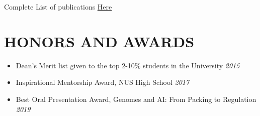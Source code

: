 \documentclass[letterpaper,11pt]{article}
\begin{document}
\hfill Complete List of publications {\href{https://tinyurl.com/pulications-sv}{\underline {Here}}}
\vspace{1mm}
\section{\bf HONORS AND AWARDS}
\begin{itemize}
    \item Dean’s Merit list given to the top 2-10\% students in the University \hfill \emph {2015}
    \item Inspirational Mentorship Award, NUS High School \hfill \emph {2017} 
    \item Best Oral Presentation Award, Genomes and AI: From Packing to Regulation \hfill \emph{2019} 
\end{itemize}

\vspace{2mm}
\end{document}
